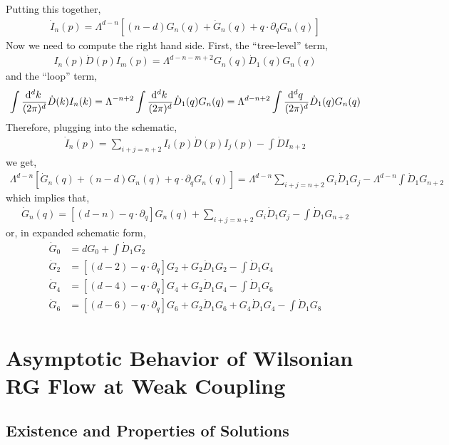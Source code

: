 \documentclass[12pt]{article}
\begin{document}
Putting this together,
\begin{align*}
\dot{I}_n(p) = \Lambda^{d - n} \left[ (n - d) G_n(q) + \dot{G}_n(q) + q \cdot \partial_q G_n(q) \right]
\end{align*}
Now we need to compute the right hand side. First, the ``tree-level'' term,
\begin{align*}
I_n(p) \dot{D}(p) I_m(p) = \Lambda^{d - n - m + 2}G_n(q) \dot{D}_1(q) G_n(q)
\end{align*}
and the ``loop'' term,
\begin{align*}
\int \frac{\mathrm{d}^{d} k \:}{(2 \pi)^d} \dot{D}(k) I_n(k) = \Lambda^{- n + 2} \int \frac{\mathrm{d}^{d} k \:}{(2 \pi)^d}\dot{D}_1(q) G_n(q) = \Lambda^{d - n + 2} \int \frac{\mathrm{d}^{d} q \:}{(2 \pi)^d} \dot{D}_1(q) G_n(q)
\end{align*}
Therefore, plugging into the schematic,
\begin{align*}
\dot{I}_n(p) = \sum_{i + j = n + 2} I_i(p) \dot{D}(p) I_j(p) - \int \dot{D} I_{n + 2}
\end{align*}
we get,
\begin{align*}
\Lambda^{d - n} [\dot{G}_n(q) + (n - d) G_n(q) + q \cdot \partial_q G_n(q)] = \Lambda^{d - n} \sum_{i + j = n + 2} G_i \dot{D}_1 G_j - \Lambda^{d - n} \int \dot{D}_1 G_{n+2}
\end{align*}
which implies that,
\begin{align*}
\dot{G}_n(q) = [(d - n) - q \cdot \partial_q] G_n(q) + \sum_{i + j = n + 2} G_i \dot{D}_1 G_j - \int \dot{D}_1 G_{n+2}
\end{align*}
or, in expanded schematic form,
\begin{align*}
\dot{G}_0 & = d G_0 + \int \dot{D}_1 G_2
\\
\dot{G}_2 & = [(d - 2) - q \cdot \partial_q] G_2 + G_2 \dot{D}_1 G_2 - \int \dot{D}_1 G_4
\\
\dot{G}_4 & = [(d - 4) - q \cdot \partial_q] G_4 + G_2 \dot{D}_1 G_4 - \int \dot{D}_1 G_6
\\
\dot{G}_6 & = [(d - 6) - q \cdot \partial_q] G_6 + G_2 \dot{D}_1 G_6 + G_4 \dot{D}_1 G_4 - \int \dot{D}_1 G_8
\end{align*}
\section{Asymptotic Behavior of Wilsonian RG Flow at Weak Coupling}

\subsection{Existence and Properties of Solutions}
\end{document}
